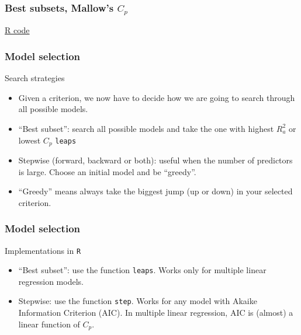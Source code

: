 \documentclass[handout]{beamer}
\newcommand{\RR}{{\tt R} \;}
\begin{document}


   \begin{frame}
   \frametitle{Best subsets, Mallow's $C_p$}
   \begin{center}
   \end{center}
   \href{http://stats191.stanford.edu/selection.html#election-example-best-subset}{R code}
   \end{frame}


   \begin{frame} \frametitle{Model selection}

   \begin{block}
   {Search strategies                     }


   \begin{itemize}[<+->]


   \item Given a criterion, we now have to decide how we are going
   to search through all possible models.
   \item ``Best subset'': search all possible models and take the one
   with highest $R^2_a$ or lowest $C_p$ {\tt leaps}

   \item Stepwise (forward, backward or both): useful when the number of predictors is large. Choose an initial model and be ``greedy''.

   \item ``Greedy'' means always take the biggest jump (up or down) in your selected criterion.
   \end{itemize}
   \end{block}
   \end{frame}


   \begin{frame} \frametitle{Model selection}

   \begin{block}
   {Implementations in \RR}

   \begin{itemize}

   \item ``Best subset'': use the function {\tt leaps}. Works only for multiple linear regression models.

   \item Stepwise: use the function {\tt step}. Works for any model with
   Akaike Information Criterion (AIC). In multiple linear regression, AIC is (almost) a linear function of $C_p$.


   \end{itemize}
   \end{block}
   \end{frame}
\end{document}
